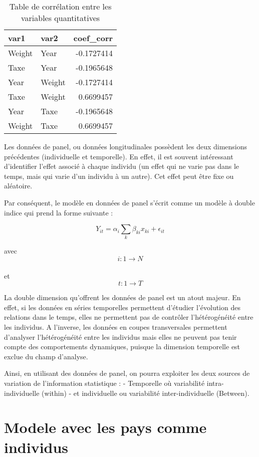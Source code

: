 \documentclass[
]{book}
\begin{document}
\begin{table}

\caption{\label{tab:unnamed-chunk-40}Table de corrélation entre les variables quantitatives}
\centering
\begin{tabular}[t]{l|l|r}
\hline
var1 & var2 & coef\_corr\\
\hline
Weight & Year & -0.1727414\\
\hline
Taxe & Year & -0.1965648\\
\hline
Year & Weight & -0.1727414\\
\hline
Taxe & Weight & 0.6699457\\
\hline
Year & Taxe & -0.1965648\\
\hline
Weight & Taxe & 0.6699457\\
\hline
\end{tabular}
\end{table}

Les données de panel, ou données longitudinales possèdent les deux dimensions précédentes (individuelle et temporelle). En effet, il est souvent intéressant d'identifier l'effet associé à chaque individu (un effet qui ne varie pas dans le temps, mais qui varie d'un individu à un autre). Cet effet peut être fixe ou aléatoire.

Par conséquent, le modèle en données de panel s'écrit comme un modèle à double indice qui prend la forme suivante :

\[ Y_{it}= \alpha_i\sum_{k}\beta_{ki}x_{ki}+ \epsilon_{it} \]

avec
\[ i:1 \rightarrow N \]\\
et
\[ t:1 \rightarrow T \]

La double dimension qu'offrent les données de panel est un atout majeur. En effet, si les données en séries temporelles permettent d'étudier l'évolution des relations dans le temps, elles ne permettent pas de contrôler l'hétérogénéité entre les individus. A l'inverse, les données en coupes transversales permettent d'analyser l'hétérogénéité entre les individus mais elles ne peuvent pas tenir compte des comportements dynamiques, puisque la dimension temporelle est exclue du champ d'analyse.

Ainsi, en utilisant des données de panel, on pourra exploiter les deux sources de variation de l'information statistique :
- Temporelle où variabilité intra-individuelle (within)
- et individuelle ou variabilité inter-individuelle (Between).

\hypertarget{modele-avec-les-pays-comme-individus}{%
\section{Modele avec les pays comme individus}\label{modele-avec-les-pays-comme-individus}}
\end{document}
